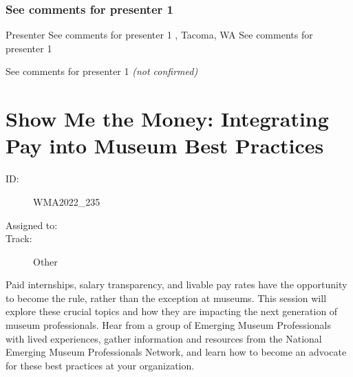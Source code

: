 \documentclass{report}
\begin{document}
              
                \subsubsection*{  See comments for presenter 1 }
                Presenter\newline
                See comments for presenter 1\newline
                , Tacoma, WA
                \newline
                See comments for presenter 1\newline
                
                

                See comments for presenter 1
                \emph{ (not confirmed) }
              

              
        
          \newpage
          \section{ Show Me the Money: Integrating Pay into Museum Best Practices  }
            \begin{description}
              \item [ID:]
              WMA2022\_235

              \item [Assigned to:]
                \item [Track:]Other~
              \end{description}

              Paid internships, salary transparency, and livable pay rates have the opportunity to become the rule, rather than the exception at museums. This session will explore these crucial topics and how they are impacting the next generation of museum professionals. Hear from a group of Emerging Museum Professionals with lived experiences, gather information and resources from the National Emerging Museum Professionals Network, and learn how to become an advocate for these best practices at your organization.
\end{document}
